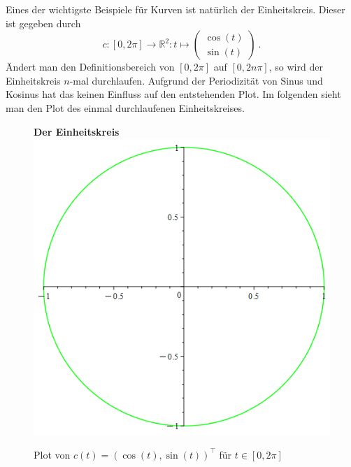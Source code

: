 \documentclass[12pt]{article}
\newenvironment{Fig}{\begin{figure}[H]
\begin{center}}{\end{center}\end{figure}}
\begin{document}
Eines der wichtigste Beispiele für Kurven ist natürlich der Einheitskreis. Dieser ist gegeben durch
\[c: [0, 2\pi] \rightarrow \mathbb{R}^2: t \mapsto \begin{pmatrix}
\cos(t) \\ \sin(t)\end{pmatrix}~.\]
Ändert man den Definitionsbereich von $[0,2\pi]$ auf $[0,2n\pi]$, so wird der Einheitskreis $n$-mal durchlaufen. Aufgrund der Periodizität von Sinus und Kosinus hat das keinen Einfluss auf den entstehenden Plot. Im folgenden sieht man den Plot des einmal durchlaufenen Einheitskreises.
\begin{Fig}
\textbf{Der Einheitskreis}\\
\includegraphics[scale=0.25]{Kurve_Plot cos(t), sin(t).png}
\caption{Plot von $c(t) = \left(\cos(t), \sin(t)\right)^\top$ für $t \in [0,2\pi]$}
\label{fig:Der Einheitskreis}
\end{Fig}
\end{document}
